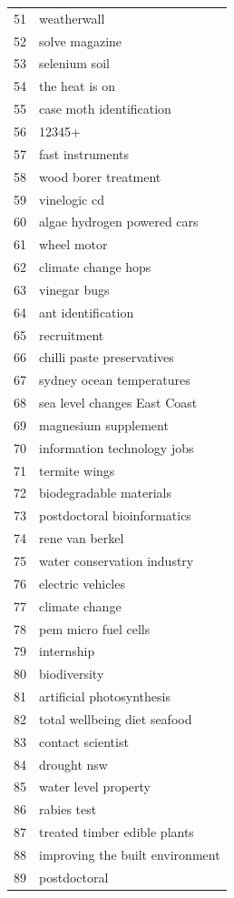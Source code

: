 \begin{center}
\begin{longtable}{c|p{6cm}}
51 & weatherwall \\
52 & solve magazine \\
53 & selenium soil \\
54 & the heat is on \\
55 & case moth identification \\
56 & 12345+ \\
57 & fast instruments \\
58 & wood borer treatment \\
59 & vinelogic cd \\
60 & algae hydrogen powered cars \\
61 & wheel motor \\
62 & climate change hops \\
63 & vinegar bugs \\
64 & ant identification \\
65 & recruitment \\
66 & chilli paste preservatives \\
67 & sydney ocean temperatures \\
68 & sea level changes East Coast \\
69 & magnesium supplement \\
70 & information technology jobs \\
71 & termite wings \\
72 & biodegradable materials \\
73 & postdoctoral bioinformatics \\
74 & rene van berkel \\
75 & water conservation industry \\
76 & electric vehicles \\
77 & climate change \\
78 & pem micro fuel cells \\
79 & internship \\
80 & biodiversity \\
81 & artificial photosynthesis \\
82 & total wellbeing diet seafood \\
83 & contact scientist \\
84 & drought nsw \\
85 & water level property \\
86 & rabies test \\
87 & treated timber edible plants \\
88 & improving the built environment \\
89 & postdoctoral \\

\end{longtable}
\end{center}
